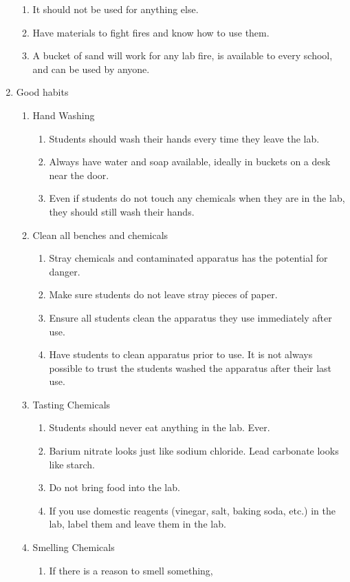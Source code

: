 \begin{enumerate}
\begin{enumerate}
\item{It should not be used for anything else.}
\item{Have materials to fight fires and know how to use them.}
\item{A bucket of sand will work for any lab fire, 
is available to every school, and can be used by anyone.}
\end{enumerate}
\item{Good habits}
\begin{enumerate}
\item{Hand Washing}
\begin{enumerate}
\item{Students should wash their hands every time they leave the lab.}
\item{Always have water and soap available, 
ideally in buckets on a desk near the door.}
\item{Even if students do not touch any chemicals when they are in the lab, 
they should still wash their hands. }
\end{enumerate}
\item{Clean all benches and chemicals}
\begin{enumerate}
\item{Stray chemicals and contaminated apparatus has the potential for danger.}
\item{Make sure students do not leave stray pieces of paper.}
\item{Ensure all students clean the apparatus they use immediately after use.}
\item{Have students to clean apparatus prior to use. 
It is not always possible to trust the students washed the apparatus 
after their last use.}
\end{enumerate}
\item{Tasting Chemicals}
\begin{enumerate}
\item{Students should never eat anything in the lab. Ever.}
\item{Barium nitrate looks just like sodium chloride. 
Lead carbonate looks like starch.}
\item{Do not bring food into the lab.}
\item{If you use domestic reagents 
(vinegar, salt, baking soda, etc.) in the lab, 
label them and leave them in the lab.}
\end{enumerate}
\item{Smelling Chemicals}
\begin{enumerate}
\item{If there is a reason to smell something, 
}
\end{enumerate}
\end{enumerate}
\end{enumerate}
